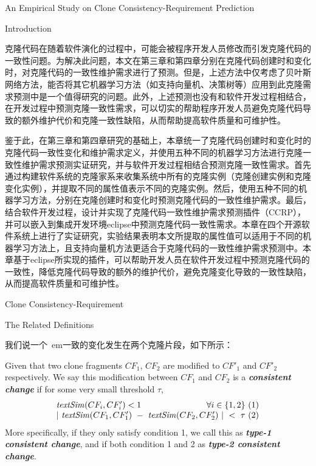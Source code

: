 
{An Empirical Study on Clone Consistency-Requirement Prediction}


{Introduction}

克隆代码在随着软件演化的过程中，可能会被程序开发人员修改而引发克隆代码的一致性问题。为解决此问题，本文在第三章和第四章分别在克隆代码创建时和变化时，对克隆代码的一致性维护需求进行了预测。但是，上述方法中仅考虑了贝叶斯网络方法，能否将其它机器学习方法（如支持向量机、决策树等）应用到此克隆需求预测中是一个值得研究的问题。此外，上述预测也没有和软件开发过程相结合，在开发过程中预测克隆一致性需求，可以切实的帮助程序开发人员避免克隆代码导致的额外维护代价和克隆一致性缺陷，从而帮助提高软件质量和可维护性。

鉴于此，在第三章和第四章研究的基础上，本章统一了克隆代码创建时和变化时的克隆代码一致性变化和维护需求定义，并使用五种不同的机器学习方法进行克隆一致性维护需求预测实证研究，并与软件开发过程相结合预测克隆一致性需求。首先通过构建软件系统的克隆家系来收集系统中所有的克隆实例（克隆创建实例和克隆变化实例），并提取不同的属性值表示不同的克隆实例。然后，使用五种不同的机器学习方法，分别在克隆创建时和变化时预测克隆代码的一致性维护需求。最后，结合软件开发过程，设计并实现了克隆代码一致性维护需求预测插件（CCRP），并可以嵌入到集成开发环境eclipse中预测克隆代码一致性需求。本章在四个开源软件系统上进行了实证研究，实验结果表明本文所提取的属性值可以适用于不同的机器学习方法上，且支持向量机方法更适合于克隆代码的一致性维护需求预测中。本章基于eclipse所实现的插件，可以帮助开发人员在软件开发过程中预测克隆代码的一致性，降低克隆代码导致的额外的维护代价，避免克隆变化导致的一致性缺陷，从而提高软件质量和可维护性。

{Clone Consistency-Requirement}

{The Related Definitions}

我们说一个{\ em一致的变化}发生在两个克隆片段，如下所示：

\begin{definition}  
Given that two clone fragments $CF_1$, $CF_2$ are modified to $CF'_1$ and $CF'_2$ respectively. 
We say this modification between $CF_1$ and $CF_2$ is a {\em\bf consistent change\/} if for some very small threshold $\tau$, 
  \[
  \begin{array}[t]{lr}
    \mathit{textSim}(CF_i, CF'_i) < 1 & \forall i \in \{1,2\}~(1) \\
    \multicolumn{2}{c}{| ~\mathit{textSim}(CF_1,CF'_1)  ~-~ \mathit{textSim}(CF_2,CF'_2) ~| ~< ~ \tau~(2)}
  \end{array}
  \]
More specifically, if they only satisfy condition 1, we call this as {\bf \em type-1 consistent change}, and if both condition 1 and 2 as {\bf \em type-2 consistent change}.
\end{definition}

